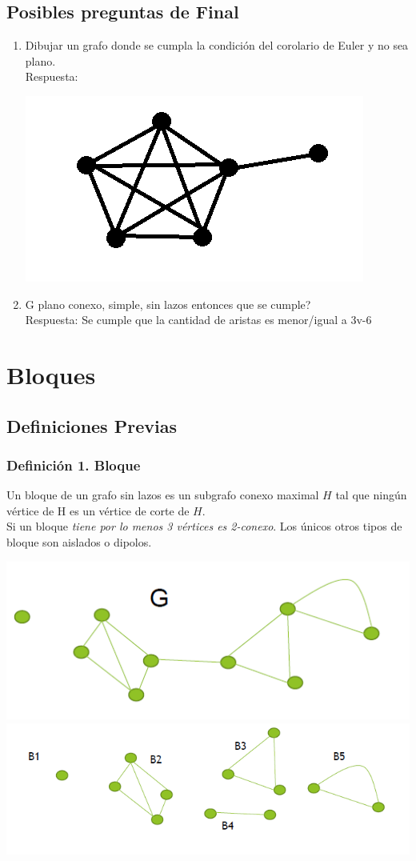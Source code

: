 \documentclass{article}
\begin{document}
\subsection{Posibles preguntas de Final}
\begin{enumerate}
    \item Dibujar un grafo donde se cumpla la condición del corolario de Euler y no sea plano.
    \\Respuesta:
    \begin{center}
        \includegraphics[width=.30\textwidth]{corolPeroNoPlano.PNG}
    \end{center}
    \item G plano conexo, simple, sin lazos entonces que se cumple? 
    \\Respuesta: Se cumple que la cantidad de aristas es menor/igual a 3v-6
\end{enumerate}

\newpage
\section{Bloques}
\subsection{Definiciones Previas}
\subsubsection*{Definición 1. Bloque}
Un bloque de un grafo sin lazos es un subgrafo conexo maximal $H$
tal que ningún vértice de H es un vértice de corte de $H$.
\\Si un bloque \emph{tiene por lo menos 3 vértices es 2-conexo}. Los únicos otros tipos
de bloque son aislados o dipolos.
\begin{center}
    \includegraphics[width=.50\textwidth]{bloqueG.PNG}
    \includegraphics[width=.50\textwidth]{bloquesDeG.PNG}
\end{center}
\end{document}
